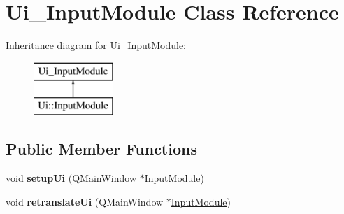 \hypertarget{class_ui___input_module}{}\section{Ui\+\_\+\+Input\+Module Class Reference}
\label{class_ui___input_module}
Inheritance diagram for Ui\+\_\+\+Input\+Module\+:\begin{figure}[H]
\begin{center}
\leavevmode
\includegraphics[height=2.000000cm]{class_ui___input_module}
\end{center}
\end{figure}
\subsection*{Public Member Functions}
\begin{DoxyCompactItemize}
\item 
\hypertarget{class_ui___input_module_aaf8f1500730e5aed8f431e0e2f369cab}{}void {\bfseries setup\+Ui} (Q\+Main\+Window $\ast$\hyperlink{class_input_module}{Input\+Module})\label{class_ui___input_module_aaf8f1500730e5aed8f431e0e2f369cab}

\item 
\hypertarget{class_ui___input_module_adea88dcba3a7d593bf259cf460cfd37c}{}void {\bfseries retranslate\+Ui} (Q\+Main\+Window $\ast$\hyperlink{class_input_module}{Input\+Module})\label{class_ui___input_module_adea88dcba3a7d593bf259cf460cfd37c}

\end{DoxyCompactItemize}

